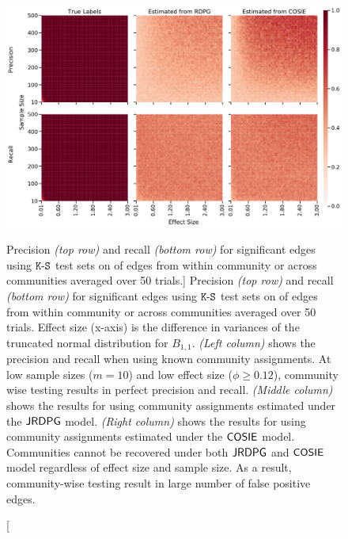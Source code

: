 \begin{figure}
    \centering
    \includegraphics[width=.9\textwidth]{figures/dnd/exp4_vars_final.pdf}
    \caption
    [Precision \textit{(top row)} and recall \textit{(bottom row)} for significant edges using $\operatorname{\mathtt{K-S}}$ test sets on of edges from within community or across communities averaged over 50 trials.]
    {Precision \textit{(top row)} and recall \textit{(bottom row)} for significant edges using $\operatorname{\mathtt{K-S}}$ test sets on of edges from within community or across communities averaged over 50 trials. Effect size (x-axis) is the difference in variances of the truncated normal distribution for $B_{1,1}$.
    \textit{(Left column)} shows the precision and recall when using known community assignments. At low sample sizes ($m =10$) and low effect size ($\phi \geq 0.12$), community wise testing results in perfect precision and recall.
    \textit{(Middle column)} shows the results for using community assignments estimated under the $\operatorname{\mathsf{JRDPG}}$ model.
    \textit{(Right column)} shows the results for using community assignments estimated under the $\operatorname{\mathsf{COSIE}}$ model.
    Communities cannot be recovered under both $\operatorname{\mathsf{JRDPG}}$ and $\operatorname{\mathsf{COSIE}}$ model regardless of effect size and sample size. As a result, community-wise testing result in large number of false positive edges.
    }
    \label{fig:exp4_vars}
\end{figure}


